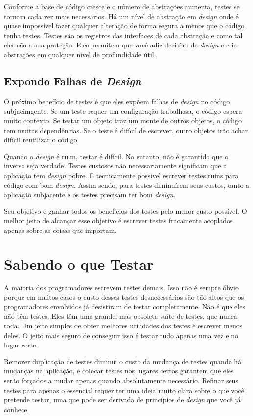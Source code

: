 Conforme a base de código cresce e o número de abstrações aumenta, testes se tornam cada vez mais necessários. Há um nível de abstração em \textit{design} onde é quase impossível fazer qualquer alteração de forma segura a menos que o código tenha testes. Testes são os registros das interfaces de cada abstração e como tal eles são a sua proteção. Eles permitem que você adie decisões de \textit{design} e crie abstrações em qualquer nível de profundidade útil.

\subsection{Expondo Falhas de \textit{Design}}

O próximo benefício de testes é que eles expõem falhas de \textit{design} no código subjacimgente. Se um teste requer um configuração trabalhosa, o código espera muito contexto. Se testar um objeto traz um monte de outros objetos, o código tem muitas dependências. Se o teste é difícil de escrever, outro objetos irão achar difícil reutilizar o código.

Quando o \textit{design} é ruim, testar é difícil. No entanto, não é garantido que o inverso seja verdade. Testes custosos não necessariamente significam que a aplicação tem \textit{design} pobre. É tecnicamente possível escrever testes ruins para código com bom \textit{design}. Assim sendo, para testes diminuírem seus custos, tanto a aplicação subjacente e os testes precisam ter bom \textit{design}.

Seu objetivo é ganhar todos os benefícios dos testes pelo menor custo possível. O melhor jeito de alcançar esse objetivo é escrever testes fracamente acoplados apenas sobre as coisas que importam.

\section{Sabendo o que Testar}

A maioria dos programadores escrevem testes demais. Isso não é sempre óbvio porque em muitos casos o custo desses testes desnecessários são tão altos que os programadores envolvidos já desistiram de testar completamente. Não é que eles não têm testes. Eles têm uma grande, mas obsoleta suíte de testes, que nunca roda. Um jeito simples de obter melhores utilidades dos testes é escrever menos deles. O jeito mais seguro de conseguir isso é testar tudo apenas uma vez e no lugar certo.

Remover duplicação de testes diminui o custo da mudança de testes quando há mudanças na aplicação, e colocar testes nos lugares certos garantem que eles serão forçados a mudar apenas quando absolutamente necessário. Refinar seus testes para apenas o essencial requer ter uma ideia muito clara sobre o que você pretende testar, uma que pode ser derivada de princípios de \textit{design} que você já conhece.

